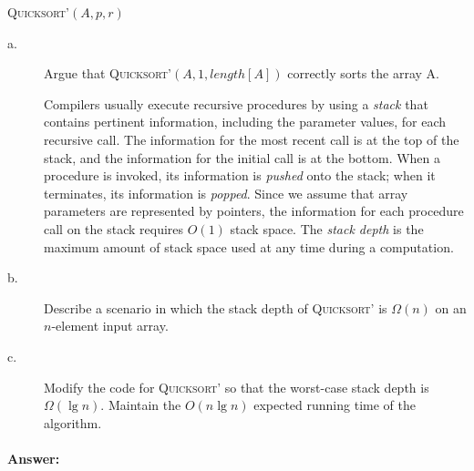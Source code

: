 \documentclass[a4paper,10pt]{article}
\newcommand{\answer}{\paragraph{Answer:}}
\begin{document}
\begin{algorithm}[H]
  \caption{\textsc{Quicksort'$(A, p, r)$}}
\end{algorithm}

\begin{description}
\item[a. \hspace{9pt}] Argue that \textsc{Quicksort'}$(A, 1, length[A])$ correctly sorts the array A.

Compilers usually execute recursive procedures by using a \emph{stack} that contains pertinent information, including
the parameter values, for each recursive call. The information for the most recent call is at the top of the stack,
and the information for the initial call is at the bottom. When a procedure is invoked, its information is \emph{pushed}
 onto the stack; when it terminates, its information is \emph{popped}. Since we assume that array parameters are
 represented by pointers, the information for each procedure call on the stack requires $O(1)$ stack space.
 The \emph{stack depth} is the maximum amount of stack space used at any time during a computation.

\item[b. \hspace{9pt}] Describe a scenario in which the stack depth of \textsc{Quicksort'} is $\Omega(n)$ on an 
$n$-element input array.

\item[c. \hspace{9pt}] Modify the code for \textsc{Quicksort'} so that the worst-case stack depth is $\Omega(\lg n)$.
Maintain the $O(n\lg n)$ expected running time of the algorithm.

\end{description}

\answer
\end{document}
